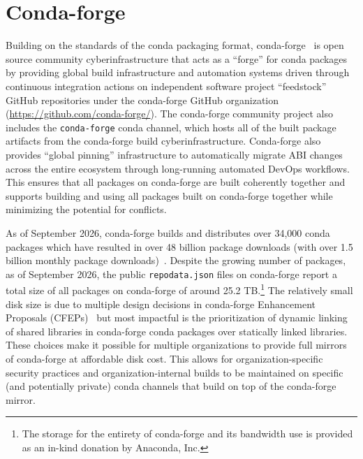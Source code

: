 \section{Conda-forge}\label{sec:conda-forge}
Building on the standards of the conda packaging format, conda-forge~\cite{conda_forge} is open source community cyberinfrastructure that acts as a ``forge'' for conda packages by providing global build infrastructure and automation systems driven through continuous integration actions on independent software project ``feedstock'' GitHub repositories under the conda-forge GitHub organization (\href{https://github.com/conda-forge/}{https://github.com/conda-forge/}).
The conda-forge community project also includes the \texttt{conda-forge} conda channel, which hosts all of the built package artifacts from the conda-forge build cyberinfrastructure.
Conda-forge also provides ``global pinning'' infrastructure to automatically migrate ABI changes across the entire ecosystem through long-running automated DevOps workflows.
This ensures that all packages on conda-forge are built coherently together and supports building and using all packages built on conda-forge together while minimizing the potential for conflicts.

As of September 2026, conda-forge builds and distributes over 34,000 conda packages which have resulted in over 48 billion package downloads (with over 1.5 billion monthly package downloads)~\cite{conda_forge-website}.
Despite the growing number of packages, as of September 2026, the public \texttt{repodata.json} files on conda-forge report a total size of all packages on conda-forge of around 25.2 TB.\footnote{The storage for the entirety of conda-forge and its bandwidth use is provided as an in-kind donation by Anaconda, Inc.}
The relatively small disk size is due to multiple design decisions in conda-forge Enhancement Proposals (CFEPs)~\cite{CFEPs} but most impactful is the prioritization of dynamic linking of shared libraries in conda-forge conda packages over statically linked libraries.
These choices make it possible for multiple organizations to provide full mirrors of conda-forge at affordable disk cost.
This allows for organization-specific security practices and organization-internal builds to be maintained on specific (and potentially private) conda channels that build on top of the conda-forge mirror.
